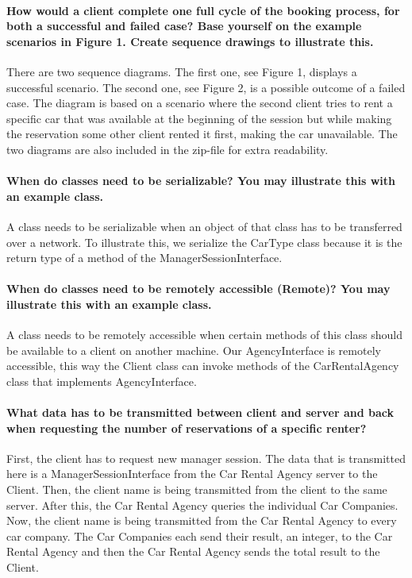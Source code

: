 \documentclass{ds-report}
\begin{document}
	\maketitle

	\paragraph{How would a client complete one full cycle of the booking process, for both a successful and
failed case? Base yourself on the example scenarios in Figure 1. Create sequence drawings to
illustrate this.\\} 
There are two sequence diagrams. The first one, see Figure 1, displays a successful scenario. The second one, see Figure 2, is a possible outcome of a failed case. The diagram is based on a scenario where the second client tries to rent a specific car that was available at the beginning of the session but while making the reservation some other client rented it first, making the car unavailable.
The two diagrams are also included in the zip-file for extra readability.


	
	\paragraph{When do classes need to be serializable? You may illustrate this with an example class.\\} 
	A class needs to be serializable when an object of that class has to be transferred over a network. To illustrate this, we serialize the CarType class because it is the return type of a method of the ManagerSessionInterface.
	
	\paragraph{When do classes need to be remotely accessible (Remote)? You may illustrate this with  an example class.\\} 
	A class needs to be remotely accessible when certain methods of this class should be available to a client on another machine.
	Our AgencyInterface is remotely accessible, this way the Client class can invoke methods of the CarRentalAgency class that implements AgencyInterface.
	
	\paragraph{What data has to be transmitted between client and server and back when requesting the number
of reservations of a specific renter?\\}
	First, the client has to request new manager session.
	The data that is transmitted here is a ManagerSessionInterface from the Car Rental Agency server to the Client.
	Then, the client name is being transmitted from the client to the same server.
	After this, the Car Rental Agency queries the individual Car Companies. Now, the client name is being transmitted from the Car Rental Agency to every car company.
	The Car Companies each send their result, an integer, to the Car Rental Agency and then the Car Rental Agency sends the total result to the Client.
	
\end{document}

